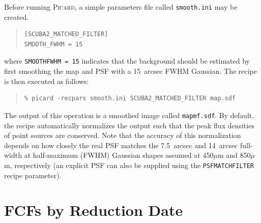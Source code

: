 \documentclass[twoside,11pt]{article}
\newcommand{\xlabel}[1]{}
\renewcommand{\_}{\texttt{\symbol{95}}}
\newenvironment{myquote}{\begin{quote}\begin{small}}{\end{small}\end{quote}}
\newcommand{\param}[1]{\texttt{#1}}
\begin{document}
Before running \textsc{Picard}, a simple parameters file called \texttt{smooth.ini}
may be created.
\begin{myquote}
\begin{verbatim}
[SCUBA2_MATCHED_FILTER]
SMOOTH_FWHM = 15
\end{verbatim}
\end{myquote}
%
where \texttt{SMOOTH\_FWHM = 15} indicates that the background should
be estimated by first smoothing the map and PSF with a 15~arcsec FWHM
Gaussian. The recipe is then executed as follows:
%
\begin{myquote}
\begin{verbatim}
% picard -recpars smooth.ini SCUBA2_MATCHED_FILTER map.sdf
\end{verbatim}
\end{myquote}
%
The output of this operation is a smoothed image called
\texttt{map\_mf.sdf}. By default, the recipe automatically normalizes
the output such that the peak flux densities of point sources are
conserved. Note that the accuracy of this normalization depends on how
closely the real PSF matches the 7.5~arcsec and 14~arcsec full-width
at half-maximum (FWHM) Gaussian shapes assumed at 450$\mu$m and
850$\mu$m, respectively (an explicit PSF can also be supplied using
the \param{PSF\_MATCHFILTER} recipe parameter).



\section{\xlabel{fcfsred}FCFs by Reduction Date}
\label{app:fcfs}
\end{document}
